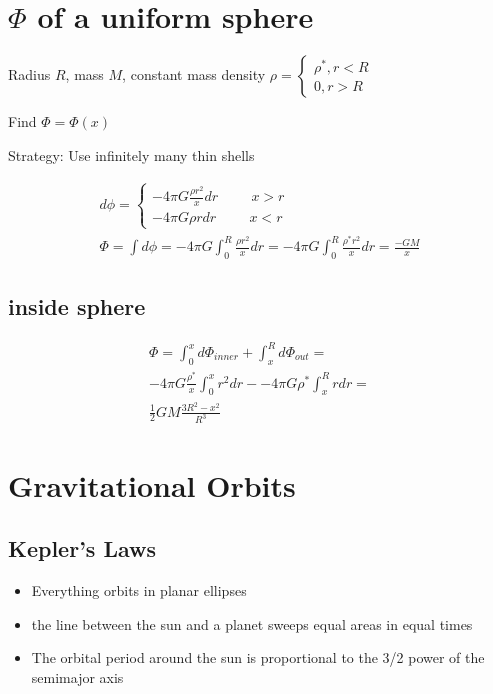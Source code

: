 \documentclass[fleqn]{report}
\newcommand{\hp}{\hspace{1cm}}
\newcommand{\equations} [1] {
\begin{gather*}
#1
\end{gather*}
}
\begin{document}
\section{$\Phi$ of a uniform sphere}
Radius $R$, mass $M$, constant mass density $\rho = \begin{cases} \rho^* , r < R \\ 0 , r > R \end{cases}$

Find $\Phi = \Phi (x)$

Strategy: Use infinitely many thin shells 

\equations{
    d \phi = 
    \begin{cases}
    -4 \pi G \frac{\rho r^2}{x} dr \hp x > r
    \\
    -4 \pi G \rho r dr \hp x < r
    \end{cases}
    \\
    \Phi = \int d \phi = -4 \pi G \int^R_{0} \frac{\rho r^2}{x} dr 
    =
    -4 \pi G \int^R_{0} \frac{\rho^* r^2}{x} dr
    =
    \frac{- GM}{x}
}

\subsection{inside sphere}
\equations{
    \Phi = \int^{x}_{0} d \Phi_{inner} + \int^{R}_{x} d \Phi_{out}
    =
    \\
    -4 \pi G \frac{\rho^*}{x} \int^x_0 r^2 dr -
    -4 \pi G \rho^* \int^R_x r dr 
    =
    \\
    \frac{1}{2} GM \frac{3 R^2 - x^2}{R^3}
}

\section{Gravitational Orbits}
\subsection{Kepler's Laws}
\begin{itemize}
    \item 
    Everything orbits in planar ellipses
    \item 
    the line between the sun and a planet sweeps equal areas in equal times 
    \item 
    The orbital period around the sun is proportional to the 3/2 power of the semimajor axis
\end{itemize}
\end{document}
